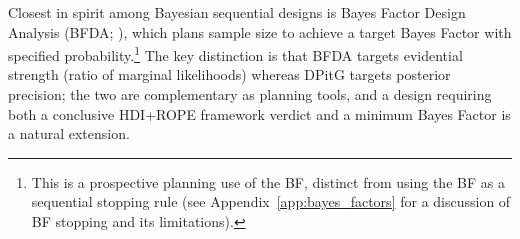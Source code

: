 Closest in spirit among Bayesian sequential designs is Bayes Factor Design Analysis
(BFDA; \citealt{schonbrodt2018}), which plans sample size to achieve a target Bayes
Factor with specified probability.\footnote{This is a prospective planning use of the BF, distinct from using the BF as a
sequential stopping rule (see Appendix~\ref{app:bayes_factors} for a discussion
of BF stopping and its limitations).}
The key distinction is that BFDA targets evidential strength (ratio of marginal
likelihoods) whereas DPitG targets posterior precision; the two are complementary
as planning tools, and a design requiring both a conclusive HDI+ROPE framework verdict and a
minimum Bayes Factor is a natural extension.

